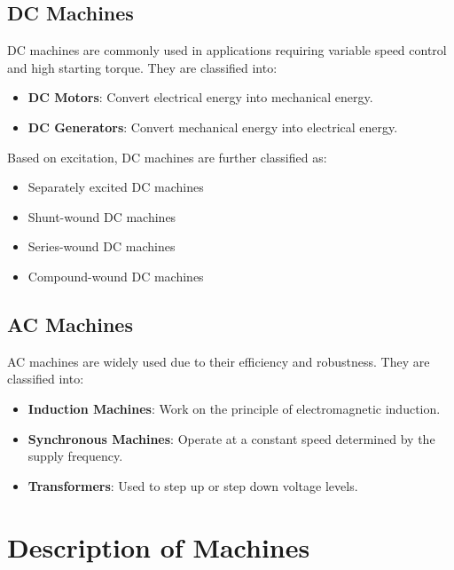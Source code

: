 \documentclass[a4paper,12pt]{article}
\begin{document}
	\subsection{DC Machines}
	DC machines are commonly used in applications requiring variable speed control and high starting torque. They are classified into:
	\begin{itemize}
		\item \textbf{DC Motors}: Convert electrical energy into mechanical energy.
		\item \textbf{DC Generators}: Convert mechanical energy into electrical energy.
	\end{itemize}
	Based on excitation, DC machines are further classified as:
	\begin{itemize}
		\item Separately excited DC machines
		\item Shunt-wound DC machines
		\item Series-wound DC machines
		\item Compound-wound DC machines
	\end{itemize}
	
	\subsection{AC Machines}
	AC machines are widely used due to their efficiency and robustness. They are classified into:
	\begin{itemize}
		\item \textbf{Induction Machines}: Work on the principle of electromagnetic induction.
		\item \textbf{Synchronous Machines}: Operate at a constant speed determined by the supply frequency.
		\item \textbf{Transformers}: Used to step up or step down voltage levels.
	\end{itemize}
	
	\section{Description of Machines}
	
\end{document}
